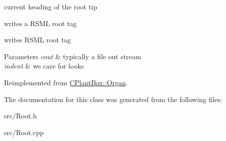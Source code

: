 current heading of the root tip 

writes a R\+S\+ML root tag

writes R\+S\+ML root tag


\begin{DoxyParams}{Parameters}
{\em cout} & typically a file out stream \\
\hline
{\em indent} & we care for looks \\
\hline
\end{DoxyParams}


Reimplemented from \hyperlink{classCPlantBox_1_1Organ_acdad546c90e915b61ac3606f1f841ba1}{C\+Plant\+Box\+::\+Organ}.



The documentation for this class was generated from the following files\+:\begin{DoxyCompactItemize}
\item 
src/Root.\+h\item 
src/Root.\+cpp\end{DoxyCompactItemize}
